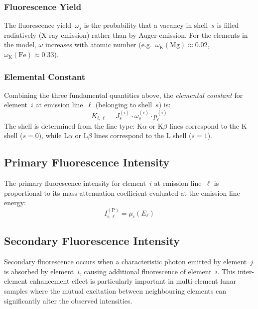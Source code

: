 \documentclass[journal,lettersize]{IEEEtran}
\begin{document}
\subsubsection{Fluorescence Yield}

The fluorescence yield~$\omega_s$ is the probability that a vacancy in
shell~$s$ is filled radiatively (X-ray emission) rather than by Auger
emission.  For the elements in the model, $\omega$ increases with atomic
number (e.g.\ $\omega_\mathrm{K}(\mathrm{Mg}) \approx 0.02$,
$\omega_\mathrm{K}(\mathrm{Fe}) \approx 0.33$).

\subsubsection{Elemental Constant}\label{sec:elem_const}

Combining the three fundamental quantities above, the \emph{elemental
constant} for element~$i$ at emission line~$\ell$ (belonging to
shell~$s$) is:
\begin{equation}\label{eq:elemental_const}
  \boxed{K_{i,\ell} = J_s^{(i)} \cdot \omega_s^{(i)} \cdot p_\ell^{(i)}}
\end{equation}
The shell is determined from the line type: K$\alpha$ or K$\beta$ lines
correspond to the K shell ($s=0$), while L$\alpha$ or L$\beta$ lines
correspond to the L shell ($s=1$).

\subsection{Primary Fluorescence Intensity}\label{sec:primary}

The primary fluorescence intensity for element~$i$ at emission
line~$\ell$ is proportional to its mass attenuation coefficient
evaluated at the emission line energy:
\begin{equation}\label{eq:primary}
  \boxed{I_{i,\ell}^{(\mathrm{P})} = \mu_i(E_\ell)}
\end{equation}

\subsection{Secondary Fluorescence Intensity}\label{sec:secondary}

Secondary fluorescence occurs when a characteristic photon emitted by
element~$j$ is absorbed by element~$i$, causing additional fluorescence
of element~$i$.  This inter-element enhancement effect is particularly
important in multi-element lunar samples where the mutual excitation
between neighbouring elements can significantly alter the observed
intensities.
\end{document}
